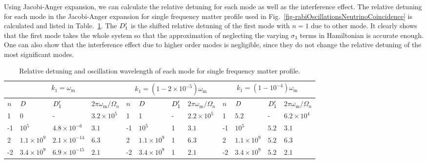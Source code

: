 Using Jacobi-Anger expansion, we can calculate the relative detuning for each mode as well as the interference effect. The relative detuning for each mode in the Jacobi-Anger expansion for single frequency matter profile used in Fig.~\ref{fig-rabiOscillationsNeutrinoCoincidence} is calculated and listed in Table.~\ref{tab-q-values-single-frequency-example}. The $D'_1$ is the shifted relative detuning of the first mode with $n=1$ due to other mode. It clearly shows that the first mode takes the whole system so that the approximation of neglecting the varying $\sigma_3$ terms in Hamiltonian is accurate enough. One can also show that the interference effect due to higher order modes is negligible, since they do not change the relative detuning of the most significant modes.






\begin{table}
\caption{\label{tab-q-values-single-frequency-example}Relative detuning and oscillation wavelength of each mode for single frequency matter profile.}
\small
\setlength\tabcolsep{2pt}
\begin{tabular}{llll|llll|llll}
 \multicolumn{4}{c|}{$k_1=\omega_{\mathrm m}$} & \multicolumn{4}{c|}{$k_1=(1-2\times 10^{-5})\omega_{\mathrm{m}}$} & \multicolumn{4}{c}{$k_1=(1-10^{-4})\omega_{\mathrm m}$} \\
\hline
   $n$ & $D$ & $D'_1$  & $2\pi\omega_{\mathrm m}/\Omega_n$ & $n$ & $D$ & $D'_1$ & $2\pi\omega_{\mathrm m}/\Omega_n$ & $n$ & $D$ & $D'_1$ & $2\pi\omega_{\mathrm m}/\Omega_n$  \\
\hline
 1 &	0  & - &   $3.2\times10^5$   & 1 &	1 &  -  &   $2.2\times 10^5$       & 1   &	$5.2$ &  - & $6.2\times10^4$   \\
-1 &	$10^5$ &  $4.8\times 10^{-6}$  &   $3.1$     &     -1 &	$10^5$ &   1  &   $3.1$               &  -1 &	$10^5$  & $5.2$ & $3.1$  \\
2 &	$1.1\times 10^9$  &   $2.1\times 10^{-14}$  &   $6.3$    &  2 & 	$1.1\times 10^9$ &  1  &    $6.3$   &  2  &	$1.1\times 10^9$  &  $5.2$  & $6.3$  \\
-2 &	$3.4\times 10^9$  & $6.9\times 10^{-15}$ & $2.1$ &    -2 &	$3.4\times10^9$ &  1  &  $2.1$          & -2  &	$3.4\times 10^9$ & $5.2$ &  $2.1$  \\
\end{tabular}
\end{table}




